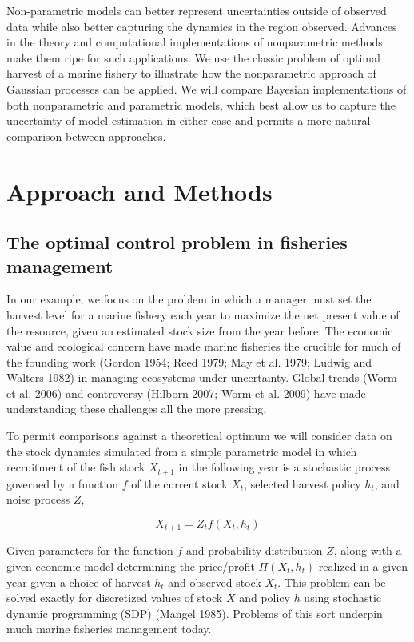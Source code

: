 \documentclass[author-year, review]{elsarticle} %
\begin{document}
Non-parametric models can better represent uncertainties outside of
observed data while also better capturing the dynamics in the region
observed. Advances in the theory and computational implementations of
nonparametric methods make them ripe for such applications. We use the
classic problem of optimal harvest of a marine fishery to illustrate how
the nonparametric approach of Gaussian processes can be applied. We will
compare Bayesian implementations of both nonparametric and parametric
models, which best allow us to capture the uncertainty of model
estimation in either case and permits a more natural comparison between
approaches.

\section{Approach and Methods}

\subsection{The optimal control problem in fisheries management}

In our example, we focus on the problem in which a manager must set the
harvest level for a marine fishery each year to maximize the net present
value of the resource, given an estimated stock size from the year
before. The economic value and ecological concern have made marine
fisheries the crucible for much of the founding work (Gordon 1954; Reed
1979; May et al. 1979; Ludwig and Walters 1982) in managing ecosystems
under uncertainty. Global trends (Worm et al. 2006) and controversy
(Hilborn 2007; Worm et al. 2009) have made understanding these
challenges all the more pressing.

To permit comparisons against a theoretical optimum we will consider
data on the stock dynamics simulated from a simple parametric model in
which recruitment of the fish stock $X_{t+1}$ in the following year is a
stochastic process governed by a function $f$ of the current stock
$X_t$, selected harvest policy $h_t$, and noise process $Z$,

\[X_{t+1} = Z_t f(X_t, h_t) \]

Given parameters for the function $f$ and probability distribution $Z$,
along with a given economic model determining the price/profit
$\Pi(X_t, h_t)$ realized in a given year given a choice of harvest $h_t$
and observed stock $X_t$. This problem can be solved exactly for
discretized values of stock $X$ and policy $h$ using stochastic dynamic
programming (SDP) (Mangel 1985). Problems of this sort underpin much
marine fisheries management today.
\end{document}
